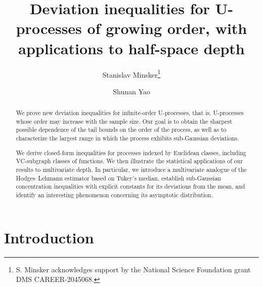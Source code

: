 \documentclass[12pt]{article}
\theoremstyle{thmstyletwo}%
\theoremstyle{thmstylethree}%
\begin{document}
\title{Deviation inequalities for U-processes of growing order, with applications to half-space depth}

\author[1]{Stanislav Minsker\footnote{S. Minsker acknowledges support by the National Science Foundation grant DMS CAREER-2045068.}}
\author[2]{Shunan Yao}



\date{}
\maketitle
\begin{abstract}
We prove new deviation inequalities for infinite-order U-processes, that is, U-processes whose order may increase with the sample size. Our goal is to obtain the sharpest possible dependence of the tail bounds on the order of the process, as well as to characterize the largest range in which the process exhibits sub-Gaussian deviations.

We derive closed-form inequalities for processes indexed by Euclidean classes, including VC-subgraph classes of functions. We then illustrate the statistical applications of our results to multivariate depth. In particular, we introduce a multivariate analogue of the Hodges–Lehmann estimator based on Tukey’s median, establish sub-Gaussian concentration inequalities with explicit constants for its deviations from the mean, and identify an interesting phenomenon concerning its asymptotic distribution.
\end{abstract}


\section{Introduction}
\label{section:intro}
\end{document}
